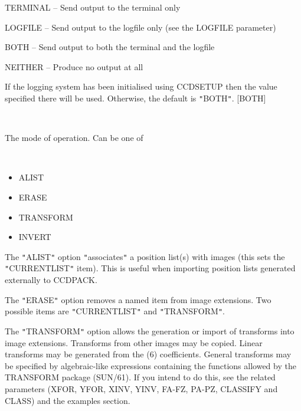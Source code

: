 \documentclass[twoside,11pt]{article}
\newcommand{\htmlref}[2]{#1}
\renewcommand{\_}{\texttt{\symbol{95}}}
\newcommand{\qt}[1]{{\tt "}#1{\tt "}}
\newcommand{\xroutine}[1]{\htmlref{{\sc #1}}{#1}}
\newcommand{\sstsubsection}[1]{ \item[{#1}] \mbox{} \\}
\newcommand{\sstitemlist}[1]{
  \mbox{} \\
  \vspace{-3.5ex}
  \begin{itemize}
     #1
  \end{itemize}
}
\newcommand{\sstitem}{\item}
\newcommand{\sstsubsection}[1]{\item[{#1}]}
\newcommand{\sstitemlist}[1]{
      \begin{itemize}
         #1
      \end{itemize}
      \\
   }
\newcommand{\sstitem}{\item}
\begin{document}
{{{{            \sstitem
               TERMINAL  -- Send output to the terminal only

            \sstitem
               LOGFILE   -- Send output to the logfile only (see the
                               LOGFILE parameter)

            \sstitem
               BOTH      -- Send output to both the terminal and the
                               logfile

            \sstitem
               NEITHER   -- Produce no output at all

         }
         If the logging system has been initialised using \xroutine{CCDSETUP}
         then the value specified there will be used. Otherwise, the
         default is \qt{BOTH}.
         [BOTH]
      }
      \sstsubsection{
         MODE = LITERAL (Read)
      }{
         The mode of operation. Can be one of
         \sstitemlist{

            \sstitem
               ALIST

            \sstitem
               ERASE

            \sstitem
               TRANSFORM

            \sstitem
               INVERT

         }
         The \qt{ALIST} option \qt{associates} a position list(s) with images
         (this sets the \qt{CURRENT\_LIST} item).  This is useful when
         importing position lists generated externally to CCDPACK.

         The \qt{ERASE} option removes a named item from image extensions.
         Two possible items are \qt{CURRENT\_LIST} and \qt{TRANSFORM}.

         The \qt{TRANSFORM} option allows the generation or import of
         transforms into image extensions. Transforms from other images
         may be copied. Linear transforms may be generated from the (6)
         coefficients. General transforms may be specified by
         algebraic-like expressions containing the functions allowed by
         the TRANSFORM package (SUN/61). If you intend to do this, see
         the related parameters (XFOR, YFOR, XINV, YINV, FA-FZ, PA-PZ,
         CLASSIFY and CLASS) and the examples section.

}}}
\end{document}
